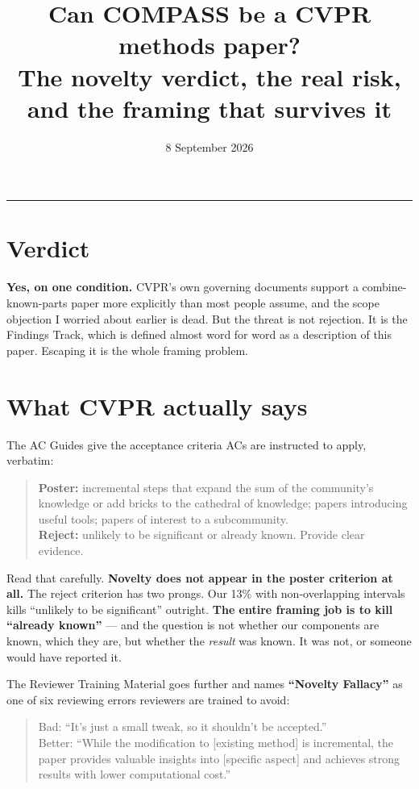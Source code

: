 \documentclass[10pt,a4paper]{article}
\title{\vspace{-1.4cm}\textbf{Can COMPASS be a CVPR methods paper?}\\[1.5mm]
\large The novelty verdict, the real risk, and the framing that survives it}
\date{8 September 2026}\author{}
\begin{document}
\maketitle\vspace{-9mm}\hrule\vspace{3mm}

\section{Verdict}

\textbf{Yes, on one condition.} CVPR's own governing documents support a
combine-known-parts paper more explicitly than most people assume, and the scope
objection I worried about earlier is dead. But the threat is not rejection. It is the
Findings Track, which is defined almost word for word as a description of this paper.
Escaping it is the whole framing problem.

\section{What CVPR actually says}

The AC Guides give the acceptance criteria ACs are instructed to apply, verbatim:

\begin{quote}
\textbf{Poster:} incremental steps that expand the sum of the community's knowledge or
add bricks to the cathedral of knowledge; papers introducing useful tools; papers of
interest to a subcommunity.\\
\textbf{Reject:} unlikely to be significant or already known. Provide clear evidence.
\end{quote}

Read that carefully. \textbf{Novelty does not appear in the poster criterion at all.} The
reject criterion has two prongs. Our 13\% with non-overlapping intervals kills
``unlikely to be significant'' outright. \textbf{The entire framing job is to kill
``already known''} — and the question is not whether our components are known, which they
are, but whether the \emph{result} was known. It was not, or someone would have reported it.

The Reviewer Training Material goes further and names \textbf{``Novelty Fallacy''} as one
of six reviewing errors reviewers are trained to avoid:

\begin{quote}
Bad: ``It's just a small tweak, so it shouldn't be accepted.''\\
Better: ``While the modification to [existing method] is incremental, the paper provides
valuable insights into [specific aspect] and achieves strong results with lower
computational cost.''
\end{quote}
\end{document}
